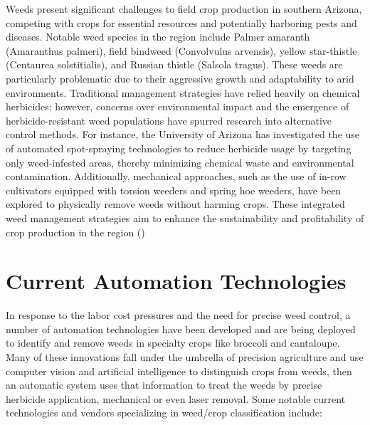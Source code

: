 \documentclass[letterpaper, notitlepage]{report}
\begin{document}
Weeds present significant challenges to field crop production in southern Arizona, competing with crops for essential resources and potentially harboring pests and diseases. Notable weed species in the region include Palmer amaranth (Amaranthus palmeri), field bindweed (Convolvulus arvensis), yellow star-thistle (Centaurea solstitialis), and Russian thistle (Salsola tragus). These weeds are particularly problematic due to their aggressive growth and adaptability to arid environments. Traditional management strategies have relied heavily on chemical herbicides; however, concerns over environmental impact and the emergence of herbicide-resistant weed populations have spurred research into alternative control methods. For instance, the University of Arizona has investigated the use of automated spot-spraying technologies to reduce herbicide usage by targeting only weed-infested areas, thereby minimizing chemical waste and environmental contamination. Additionally, mechanical approaches, such as the use of in-row cultivators equipped with torsion weeders and spring hoe weeders, have been explored to physically remove weeds without harming crops. These integrated weed management strategies aim to enhance the sustainability and profitability of crop production in the region (\cite{Sturla2022-ug, University-of-Arizona-CALESUnknown-er}) 

\section{Current Automation Technologies}

In response to the labor cost pressures and the need for precise weed control, a number of automation technologies have been developed and are being deployed to identify and remove weeds in specialty crops like broccoli and cantaloupe. Many of these innovations fall under the umbrella of precision agriculture and use computer vision and artificial intelligence to distinguish crops from weeds, then an automatic system uses that information to treat the weeds by precise herbicide application, mechanical or even laser removal. Some notable current technologies and vendors specializing in weed/crop classification include:
\end{document}
